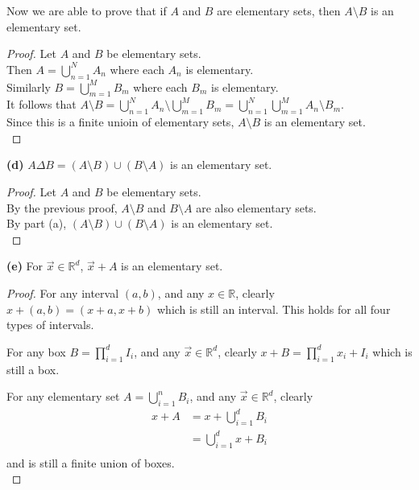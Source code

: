 \documentclass[12pt]{article}
\begin{document}
	Now we are able to prove that if $A$ and $B$ are elementary sets, then $A \setminus B$ is an elementary set. \\
	
	\begin{proof}
		Let $A$ and $B$ be elementary sets. \\
		Then $A = \bigcup\limits_{n=1}^{N} A_{n}$ where each $A_{n}$ is elementary. \\
		Similarly $B = \bigcup\limits_{m=1}^{M} B_{m}$ where each $B_{m}$ is elementary. \\
		It follows that $A \setminus B = \bigcup\limits_{n=1}^{N} A_{n} \setminus \bigcup\limits_{m=1}^{M} B_{m} = \bigcup\limits_{n=1}^{N}  \bigcup\limits_{m=1}^{M} A_{n} \setminus B_{m}$. \\
		Since this is a finite unioin of elementary sets, $A \setminus B$ is an elementary set. \\
	\end{proof}

\hspace{-4 ex}\textbf{(d)} $A \Delta B = (A \setminus B) \cup (B \setminus A)$ is an elementary set.
\begin{proof}
	Let $A$ and $B$ be elementary sets. \\
	By the previous proof, $A \setminus B$ and $B \setminus A$ are also elementary sets. \\
	By part (a), $(A \setminus B) \cup (B \setminus A)$ is an elementary set.\\
\end{proof}

\hspace{-4 ex}\textbf{(e)} For $\vec{x} \in \mathbb{R}^{d}$, $\vec{x} + A$ is an elementary set. \bigbreak

\begin{proof}
	For any interval $(a,b)$, and any $x \in \mathbb{R}$, clearly $x + (a,b) = (x+a, x+b)$ which is still an interval. This holds for all four types of intervals. \bigbreak
	
	For any box $B = \prod\limits_{i=1}^{d}I_{i}$, and any $\vec{x} \in \mathbb{R}^{d}$, clearly $x + B = \prod\limits_{i=1}^{d}x_{i}+I_{i}$ which is still a box. \bigbreak
	
	For any elementary set $A = \bigcup\limits_{i=1}^{n}B_{i}$, and any $\vec{x} \in \mathbb{R}^{d}$, clearly \\
	\begin{align}
		x + A & = x + \bigcup\limits_{i=1}^{d}B_{i} \\
		& = \bigcup\limits_{i=1}^{d}x + B_{i} \\
	\end{align}
	and is still a finite union of boxes. \\
 \bigbreak
	
	
\end{proof}
\end{document}
